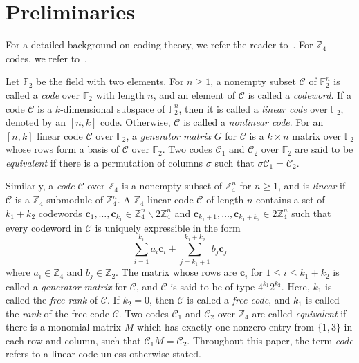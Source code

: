 \documentclass{article}
\theoremstyle{definition}
\theoremstyle{remark}
\begin{document}
\section{Preliminaries}
For a detailed background on coding theory, we refer the reader to~\cite{book-HP,book-MS}. For $\mathbb{Z}_4$ codes, we refer to~\cite{book-W}.

Let $\mathbb{F}_2$ be the field with two elements. For $n\ge 1$, a nonempty subset $\mathcal{C}$ of $\mathbb{F}_2^n$ is called a \textit{code} over $\mathbb{F}_2$ with length $n$, and an element of $\mathcal{C}$ is called a \textit{codeword}. If a code $\mathcal{C}$ is a $k$-dimensional subspace of $\mathbb{F}_2^n$, then it is called a \textit{linear code} over $\mathbb{F}_2$, denoted by an $[n, k]$ code. Otherwise, $\mathcal{C}$ is called a \textit{nonlinear code}. For an $[n, k]$ linear code $\mathcal{C}$ over $\mathbb{F}_2$, a \textit{generator matrix} $G$ for $\mathcal{C}$ is a $k\times n$ matrix over $\mathbb{F}_2$ whose rows form a basis of $\mathcal{C}$ over $\mathbb{F}_2$. Two codes $\mathcal{C}_1$ and $\mathcal{C}_2$ over $\mathbb{F}_2$ are said to be \textit{equivalent} if there is a permutation of columns $\sigma$ such that $\sigma\mathcal{C}_1=\mathcal{C}_2$.

Similarly, a \textit{code} $\mathcal{C}$ over $\mathbb{Z}_4$ is a nonempty subset of $\mathbb{Z}_4^n$ for $n\ge 1$, and is \textit{linear} if $\mathcal{C}$ is a $\mathbb{Z}_4$-submodule of $\mathbb{Z}_4^n$. A $\mathbb{Z}_4$ linear code $\mathcal{C}$ of length $n$ contains a set of $k_1+k_2$ codewords $\mathbf{c}_1, \ldots, \mathbf{c}_{k_1}\in\mathbb{Z}_4^n\backslash2\mathbb{Z}_4^n$ and $\mathbf{c}_{k_1+1}, \ldots, \mathbf{c}_{k_1+k_2}\in 2\mathbb{Z}_4^n$ such that every codeword in $\mathcal{C}$ is uniquely expressible in the form
\[
\sum_{i=1}^{k_1}a_i\mathbf{c}_i+\sum_{j=k_1+1}^{k_1+k_2}b_j\mathbf{c}_j
\]
where $a_i\in\mathbb{Z}_4$ and $b_j\in\mathbb{Z}_2$. The matrix whose rows are $\mathbf{c}_i$ for $1\le i\le k_1+k_2$ is called a \textit{generator matrix} for $\mathcal{C}$, and $\mathcal{C}$ is said to be of type $4^{k_1}2^{k_2}$. Here, $k_1$ is called the \textit{free rank} of $\mathcal{C}$. If $k_2=0$, then $\mathcal{C}$ is called a \textit{free code}, and $k_1$ is called the \textit{rank} of the free code $\mathcal{C}$. Two codes $\mathcal{C}_1$ and $\mathcal{C}_2$ over $\mathbb{Z}_4$ are called \textit{equivalent} if there is a monomial matrix $M$ which has exactly one nonzero entry from $\{1, 3\}$ in each row and column, such that $\mathcal{C}_1M=\mathcal{C}_2$. Throughout this paper, the term \textit{code} refers to a linear code unless otherwise stated.
\end{document}
